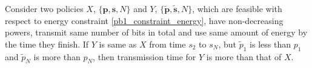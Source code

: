 \begin{lemma}

% 
Consider two policies $X$, $\{\bm{p},\bm{s},N\}$  and $Y$, $\{\bm{\widetilde{p}},\bm{\widetilde{s}},N\}$, which are feasible with respect to energy constraint \eqref{pb1_constraint_energy}, have non-decreasing powers, transmit same number of bits in total and use same amount of energy by the time they finish. If $Y$ is same as $X$ from time $s_2$ to $s_{N}$, but $\widetilde{p}_1$ is less than $p_1$ and $\widetilde{p}_N$ is more than $p_N$, then transmission time for $Y$ is more than that of $X$.

\label{lemma_increase_time}
\end{lemma}
